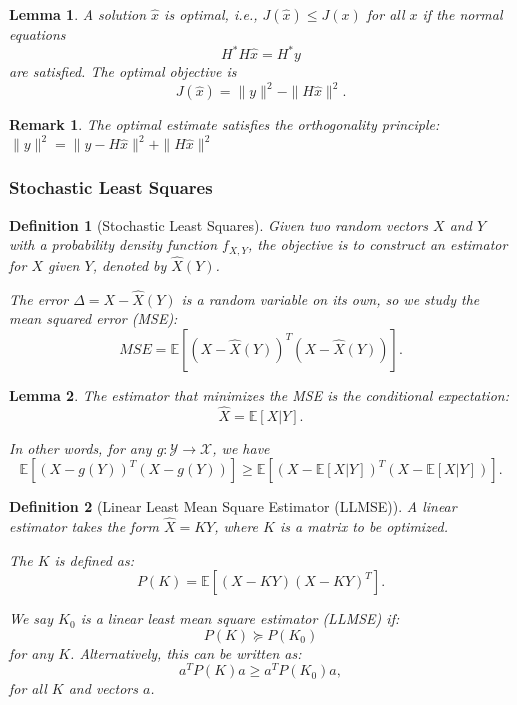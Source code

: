 \documentclass[a4 paper]{article}
\numberwithin{equation}{section}
\theoremstyle{boldStyle}
\newtheorem{remark}{Remark}[section]
\theoremstyle{boldBlueStyle}
\newtheorem{lemma}{Lemma}[section]
\theoremstyle{boldPurpleStyle}
\theoremstyle{boldRedStyle}
\newtheorem{definition}{Definition}[section]
\theoremstyle{boldGreenStyle}
\begin{document}
\begin{lemma}
A solution \( \hat{x} \) is optimal, i.e., \( J(\hat{x}) \leq J(x) \) for all \( x \) if the normal equations
\[
H^* H \hat{x} = H^* y
\]
are satisfied. The optimal objective is
\[
J(\hat{x}) = \|y\|^2 - \|H \hat{x}\|^2.
\]
\end{lemma}


\begin{remark}
  The optimal estimate satisfies the orthogonality principle: \( \|y\|^2 =  \|y - H \hat{x}\|^2  + \|H \hat{x}\|^2 \)
\end{remark}



\subsubsection{Stochastic Least Squares}


\begin{definition}[Stochastic Least Squares]
  Given two random vectors \( X \) and \( Y \) with a probability density function \( f_{X,Y} \), 
  the objective is to construct an estimator for \( X \) given \( Y \), denoted by \( \hat{X}(Y) \). 
  
  The error \( \Delta = X - \hat{X}(Y) \) is a random variable on its own, so we study the mean squared error (MSE):
  \[
  MSE = \mathbb{E}[(X - \hat{X}(Y))^T (X - \hat{X}(Y))].
  \]
\end{definition}

\begin{lemma}
The estimator that minimizes the MSE is the conditional expectation:
\[
\hat{X} = \mathbb{E}[X | Y].
\]

In other words, for any \( g : \mathcal{Y} \rightarrow \mathcal{X} \), we have
\[
\mathbb{E}[(X - g(Y))^T (X - g(Y))] \geq \mathbb{E}[(X - \mathbb{E}[X | Y])^T (X - \mathbb{E}[X | Y])].
\]
\end{lemma}



\begin{definition}[Linear Least Mean Square Estimator (LLMSE)]
  A linear estimator takes the form \( \hat{X} = K Y \), where \( K \) is a matrix to be optimized. 
  
  The  \( K \) is defined as:
  \[
  P(K) = \mathbb{E}[(X - K Y)(X - K Y)^T].
  \]
  
  We say \( K_0 \) is a linear least mean square estimator (LLMSE) if:
  \[
  P(K) \succeq P(K_0)
  \]
  for any \( K \). Alternatively, this can be written as:
  \[
  a^T P(K) a \geq a^T P(K_0) a,
  \]
  for all \( K \) and vectors \( a \). 
\end{definition}
\end{document}
